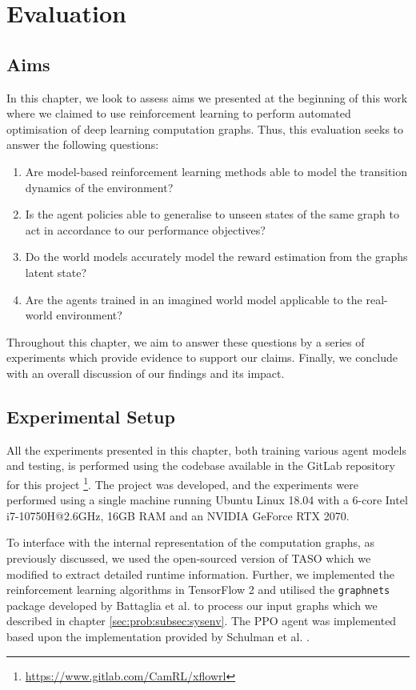 \chapter{Evaluation}

\section{Aims}

In this chapter, we look to assess aims we presented at the beginning of this work where we claimed to use reinforcement learning to perform automated optimisation of deep learning computation graphs. Thus, this evaluation seeks to answer the following questions:

\begin{enumerate}
  \item Are model-based reinforcement learning methods able to model the transition dynamics of the environment?
  \item Is the agent policies able to generalise to unseen states of the same graph to act in accordance to our performance objectives?
  \item Do the world models accurately model the reward estimation from the graphs latent state?
  \item Are the agents trained in an imagined world model applicable to the real-world environment?
\end{enumerate}

Throughout this chapter, we aim to answer these questions by a series of experiments which provide evidence to support our claims. Finally, we conclude with an overall discussion of our findings and its impact.

\section{Experimental Setup}

All the experiments presented in this chapter, both training various agent models and testing, is performed using the codebase available in the GitLab repository for this project \footnote{\url{https://www.gitlab.com/CamRL/xflowrl}}. The project was developed, and the experiments were performed using a single machine running Ubuntu Linux 18.04 with a 6-core Intel i7-10750H@2.6GHz, 16GB RAM and an NVIDIA GeForce RTX 2070.

To interface with the internal representation of the computation graphs, as previously discussed, we used the open-sourced version of TASO \cite{jia2019taso} which we modified to extract detailed runtime information. Further, we implemented the reinforcement learning algorithms in TensorFlow 2 \cite{tensorflow2015-whitepaper} and utilised the \texttt{graph\textunderscore nets} package developed by Battaglia et al. \cite{battaglia2018relational} to process our input graphs which we described in chapter \ref{sec:prob:subsec:sysenv}. The PPO agent was implemented based upon the implementation provided by Schulman et al. \cite{schulman2017proximal}.

